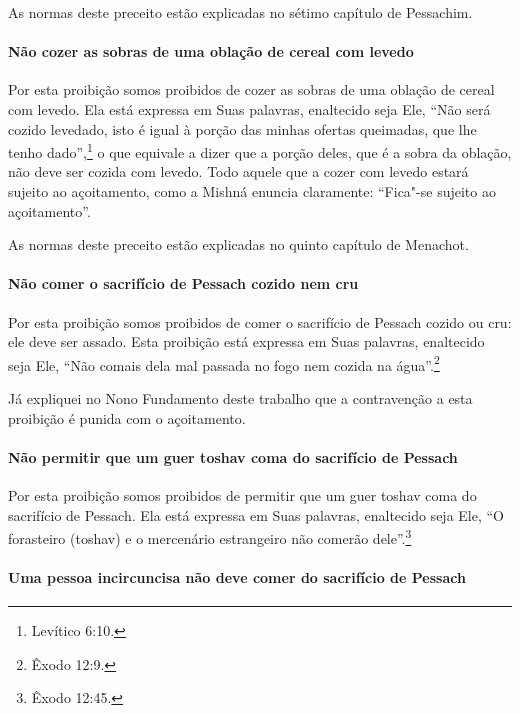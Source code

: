 \begin{multicols}{2}
As normas deste preceito estão explicadas no sétimo capítulo de Pessachim\starr.

\paragraph{Não cozer as sobras de uma oblação de cereal com levedo}

Por esta proibição somos proibidos de cozer as sobras de uma oblação de
cereal com levedo. Ela está expressa em Suas palavras, enaltecido seja
Ele, ``Não será cozido levedado, isto é igual à porção das minhas
ofertas queimadas, que lhe tenho dado'',\footnote{Levítico 6:10.} o que equivale
a dizer que a porção deles, que é a sobra da oblação, não deve ser
cozida com levedo. Todo aquele que a cozer com levedo estará sujeito ao
açoitamento, como a Mishná\starr{} enuncia claramente: ``Fica"-se sujeito ao
açoitamento''.

As normas deste preceito estão explicadas no quinto capítulo de Menachot\starr.

\paragraph{Não comer o sacrifício de Pessach\starr{} cozido nem cru}

Por esta proibição somos proibidos de comer o sacrifício de Pessach\starr{}
cozido ou cru: ele deve ser assado. Esta proibição está expressa em Suas
palavras, enaltecido seja Ele, ``Não comais dela mal passada no fogo nem
cozida na água''.\footnote{Êxodo 12:9.}

Já expliquei no Nono Fundamento deste trabalho que a contravenção a
esta proibição é punida com o açoitamento.

\paragraph{Não permitir que um guer toshav\starr{} coma do sacrifício de Pessach\starr{}}

Por esta proibição somos proibidos de permitir que um guer toshav\starr{} coma do sacrifício de Pessach\starr. Ela
está expressa em Suas palavras, enaltecido seja Ele, ``O forasteiro
(toshav\starr) e o mercenário estrangeiro não comerão dele''.\footnote{Êxodo 12:45.}

\paragraph{Uma pessoa incircuncisa não deve comer do sacrifício de Pessach\starr{}}


\end{multicols}
